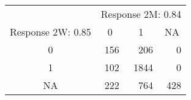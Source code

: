 \begin{tabular}{crrr}
      & \multicolumn{3}{c}{Response 2M: 0.84} \\
\cmidrule{2-4}Response 2W: 0.85 & \multicolumn{1}{c}{0} & \multicolumn{1}{c}{1} & \multicolumn{1}{c}{NA} \\
\cmidrule{2-4}0     & 156   & 206   & 0 \\
1     & 102   & 1844  & 0 \\
NA    & 222   & 764   & 428 \\
\cmidrule{2-4}\end{tabular}%
